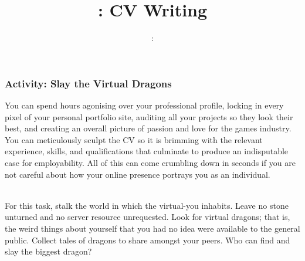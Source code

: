 \usepackage{../../beamerthemeFalmouthGamesAcademy}
\usepackage{multimedia}
\usepackage{soul}
\usepackage{tikz}

\usepackage{verbatim}
\graphicspath{ {../../} }


\usepackage[normalem]{ulem}
\usepackage{wasysym}

\usepackage{pdfpages}

\usetikzlibrary{arrows,automata}



\def\signed #1{{\leavevmode\unskip\nobreak\hfil\penalty50\hskip2em
  \hbox{}\nobreak\hfil(#1)%
  \parfillskip=0pt \finalhyphendemerits=0 \endgraf}}

\newsavebox\mybox
\newenvironment{aquote}[1]
  {\savebox\mybox{#1}\begin{quote}}
  {\signed{\usebox\mybox}\end{quote}}




\title{\sessionnumber: \normalsize{CV Writing}}
\subtitle{\modulecode: \moduletitle}

\frame{\titlepage} 
\begin{frame}
	\frametitle{Activity: Slay the Virtual Dragons}
	\small{
	You can spend hours agonising over your professional profile, locking in every pixel of your personal portfolio site, auditing all your projects so they look their best, and creating an overall picture of passion and love for the games industry. You can meticulously sculpt the CV so it is brimming with the relevant experience, skills, and qualifications that culminate to produce an indisputable case for employability. All of this can come crumbling down in seconds if you are not careful about how your online presence portrays you as an individual.  \\~\\
	}

\small{
For this task, stalk the world in which the virtual-you inhabits. Leave no stone unturned and no server resource unrequested. Look for virtual dragons; that is, the weird things about yourself that you had no idea were available to the general public. Collect tales of dragons to share amongst your peers. Who can find and slay the biggest dragon? }
\end{frame}	
	
